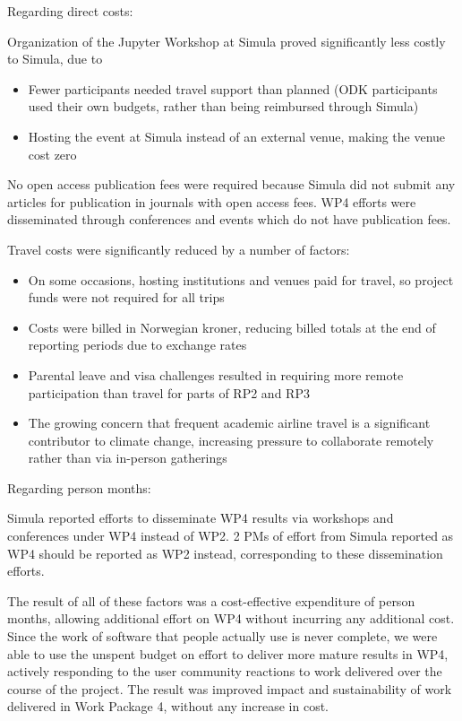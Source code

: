 Regarding direct costs:

Organization of the Jupyter Workshop at Simula proved significantly less costly to Simula, due to

\begin{itemize}
    \item Fewer participants needed travel support than planned (ODK participants used their own budgets, rather than being reimbursed through Simula)
    \item Hosting the event at Simula instead of an external venue, making the venue cost zero
\end{itemize}

No open access publication fees were required because Simula did not submit any articles for publication in journals with open access fees.
WP4 efforts were disseminated through conferences and events which do not have publication fees.

Travel costs were significantly reduced by a number of factors:

\begin{itemize}
  \item On some occasions, hosting institutions and venues paid for travel, so project funds were not required for all trips
  \item Costs were billed in Norwegian kroner, reducing billed totals at the end of reporting periods due to exchange rates
  \item Parental leave and visa challenges resulted in requiring more remote participation
    than travel for parts of RP2 and RP3
  \item The growing concern that frequent academic airline travel is a significant contributor to climate change,
    increasing pressure to collaborate remotely rather than via in-person gatherings
\end{itemize}

Regarding person months:

Simula reported efforts to disseminate WP4 results via workshops and conferences under WP4 instead of WP2.
2 PMs of effort from Simula reported as WP4 should be reported as WP2 instead,
corresponding to these dissemination efforts.

The result of all of these factors was a cost-effective expenditure of person months,
allowing additional effort on WP4 without incurring any additional cost.
Since the work of software that people actually use is never complete,
we were able to use the unspent budget on effort to deliver more mature results in WP4,
actively responding to the user community reactions to work delivered over the course of the project.
The result was improved impact and sustainability of work delivered in Work Package 4,
without any increase in cost.


